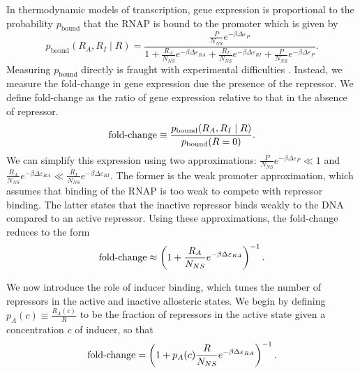In thermodynamic models of transcription, gene expression is proportional to the
probability $p_{\text{bound}}$ that the RNAP is bound to the promoter which is
given by
\begin{equation}\label{eq2}
p_{\text{bound}}(R_A, R_I \mid R)=\frac{\frac{P}{N_{NS}}e^{-\beta  \Delta\varepsilon_{P}}}{1+\frac{R_A}{N_{NS}}e^{-\beta \Delta\varepsilon_{RA}}+\frac{R_I}{N_{NS}}e^{-\beta  \Delta\varepsilon_{RI}}+\frac{P}{N_{NS}}e^{-\beta\Delta\varepsilon_{P}}}.
\end{equation}
Measuring $p_{\text{bound}}$ directly is fraught with experimental difficulties
\cite{Bintu2005}. Instead, we measure the fold-change in gene expression due the presence of the repressor. We define fold-change as the ratio of gene
expression relative to that in the absence of repressor.
\begin{equation}\label{eq3}
\operatorname{fold-change}\equiv \frac{p_{\text{bound}}(R_A, R_I \mid R)}{p_{\text{bound}}(R = 0)}.
\end{equation}
We can simplify this expression using two approximations:
$\frac{P}{N_{NS}}e^{-\beta\Delta\varepsilon_{P}}\ll 1$ and
$\frac{R_A}{N_{NS}}e^{-\beta \Delta\varepsilon_{RA}} \ll
\frac{R_I}{N_{NS}}e^{-\beta \Delta\varepsilon_{RI}}$. The former is the weak
promoter approximation, which assumes that binding of the RNAP is too weak to
compete with repressor binding\cite{Brewster2012}. The latter states that the
inactive repressor binds weakly to the DNA compared to an active repressor.
Using these approximations, the fold-change reduces to the form
\begin{equation}\label{eq4}
\operatorname{fold-change} \approx \left(1+\frac{R_A}{N_{NS}}e^{-\beta  \Delta\varepsilon_{RA}}\right)^{-1}.
\end{equation}

We now introduce the role of inducer binding, which tunes the number of
repressors in the active and inactive allosteric states. We begin by defining
$p_A(c) \equiv \frac{R_A(c)}{R}$ to be the fraction of repressors in the active
state given a concentration $c$ of inducer, so that
\begin{equation}
\operatorname{fold-change} = \left( 1+p_A(c) \frac{R}{N_{NS}}e^{-\beta
	\Delta\varepsilon_{RA}} \right)^{-1}. \label{eq5}
\end{equation}


